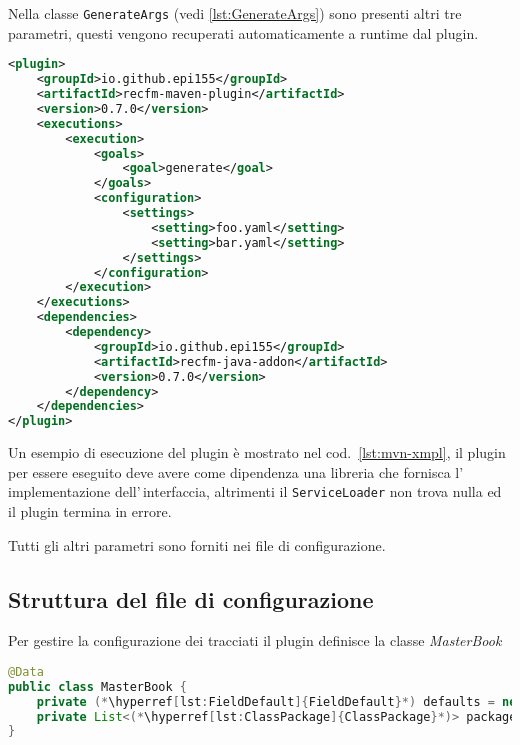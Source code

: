 \documentclass[a4paper,10pt]{report}
\begin{document}
Nella classe \verb!GenerateArgs! (vedi \ref{lst:GenerateArgs}) sono presenti 
altri tre parametri, questi vengono recuperati automaticamente a runtime dal 
plugin.


\begin{figure*}[!htb]
\begin{lstlisting}[language=XML, caption=esempio minimale di esecuzione del 
plugin, label=lst:mvn-xmpl]
<plugin>
    <groupId>io.github.epi155</groupId>
    <artifactId>recfm-maven-plugin</artifactId>
    <version>0.7.0</version>
    <executions>
        <execution>
            <goals>
                <goal>generate</goal>
            </goals>
            <configuration>
                <settings>
                    <setting>foo.yaml</setting>
                    <setting>bar.yaml</setting>
                </settings>
            </configuration>
        </execution>
    </executions>
    <dependencies>
        <dependency>
            <groupId>io.github.epi155</groupId>
            <artifactId>recfm-java-addon</artifactId>
            <version>0.7.0</version>
        </dependency>
    </dependencies>
</plugin>
\end{lstlisting}
\end{figure*}
Un esempio di esecuzione del plugin è mostrato nel cod.~\ref{lst:mvn-xmpl},
il plugin per essere eseguito deve avere come dipendenza una libreria che 
fornisca l'\,implementazione dell'\,inter\-fac\-cia, altrimenti il 
\verb!ServiceLoader! non trova nulla ed il plugin termina in errore.

Tutti gli altri parametri sono forniti nei file di configurazione.

\subsection{Struttura del file di configurazione}
Per gestire la configurazione dei tracciati il plugin definisce la classe
\textsl{MasterBook}

\begin{figure*}[!htb]
\begin{lstlisting}[language=java, caption=classe di configurazione MasterBook, 
label=lst:MasterBook]
@Data
public class MasterBook {
    private (*\hyperref[lst:FieldDefault]{FieldDefault}*) defaults = new FieldDefault();
    private List<(*\hyperref[lst:ClassPackage]{ClassPackage}*)> packages = new ArrayList<>();
}
\end{lstlisting}
\end{figure*}
\end{document}
